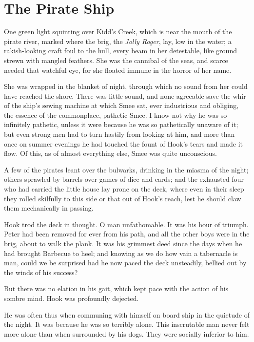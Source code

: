 
\chapter{The Pirate Ship}

One green light squinting over Kidd's Creek, which is near the mouth of the pirate river,
marked where the brig, the \emph{Jolly Roger}, lay,
low in the water;
a rakish-looking craft foul to the hull,
every beam in her detestable, like ground strewn with mangled feathers.
She was the cannibal of the seas,
and scarce needed that watchful eye, for she floated immune in the horror of her name.

She was wrapped in the blanket of night,
through which no sound from her could have reached the shore.
There was little sound,
and none agreeable save the whir of the ship's sewing machine at which Smee sat, ever industrious and obliging,
the essence of the commonplace, pathetic Smee.
I know not why he was so infinitely pathetic,
unless it were because he was so pathetically unaware of it;
but even strong men had to turn hastily from looking at him,
and more than once on summer evenings he had touched the fount of Hook's tears and made it flow.
Of this, as of almost everything else, Smee was quite unconscious.

A few of the pirates leant over the bulwarks, drinking in the miasma of the night;
others sprawled by barrels over games of dice and cards;
and the exhausted four who had carried the little house lay prone on the deck,
where even in their sleep they rolled skilfully to this side or that out of Hook's reach,
lest he should claw them mechanically in passing.

Hook trod the deck in thought.
O man unfathomable.
It was his hour of triumph.
Peter had been removed for ever from his path, and all the other boys were in the brig,
about to walk the plank.
It was his grimmest deed since the days when he had brought Barbecue to heel;
and knowing as we do how vain a tabernacle is man,
could we be surprised had he now paced the deck unsteadily,
bellied out by the winds of his success?

But there was no elation in his gait, which kept pace with the action of his sombre mind.
Hook was profoundly dejected.

He was often thus when communing with himself on board ship in the quietude of the night.
It was because he was so terribly alone.
This inscrutable man never felt more alone than when surrounded by his dogs.
They were socially inferior to him.


